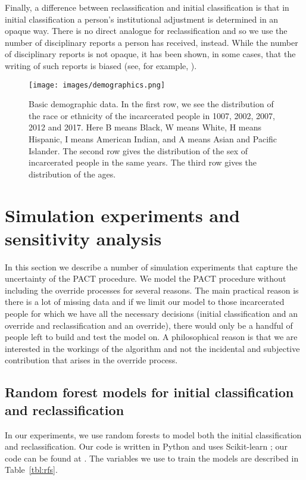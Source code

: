 \documentclass{amsproc}
\numberwithin{equation}{section}
\theoremstyle{plain}
\theoremstyle{remark}
\begin{document}
Finally, a difference between reclassification and initial classification is that in initial classification a person's institutional adjustment is determined in an opaque way.  There is no direct analogue for reclassification and so we use the number of disciplinary reports a person has received, instead.  While the number of disciplinary reports is not opaque, it has been shown, in some cases, that the writing of such reports is biased (see, for example, \cite{nytimes}).

\begin{figure}
\centering
\texttt{[image: images/demographics.png]}
\caption{Basic demographic data.  In the first row, we see the distribution of the race or ethnicity of the incarcerated people in 1007, 2002, 2007, 2012 and 2017.  Here B means Black, W means White, H means Hispanic, I means American Indian, and A means Asian and Pacific Islander.  The second row gives the distribution of the sex of incarcerated people in the same years.  The third row gives the distribution of the ages.}\label{fig:demographics}
\end{figure}

\section{Simulation experiments and sensitivity analysis}\label{sec:sa}

In this section we describe a number of simulation experiments that capture the uncertainty of the PACT procedure.  We model the PACT procedure without including the override processes for several reasons.  The main practical reason is there is a lot of missing data and if we limit our model to those incarcerated people for which we have all the necessary decisions (initial classification and an override and reclassification and an override), there would only be a handful of people left to build and test the model on.  A philosophical reason is that we are interested in the workings of the algorithm and not the incidental and subjective contribution that arises in the override process.  


\subsection{Random forest models for initial classification and reclassification}

In our experiments, we use random forests to model both the initial classification and reclassification.  Our code is written in Python and uses Scikit-learn \cite{scikit-learn}; our code can be found at \cite{repo}.  The variables we use to train the models are described in Table~\ref{tbl:rfs}.  
\end{document}

